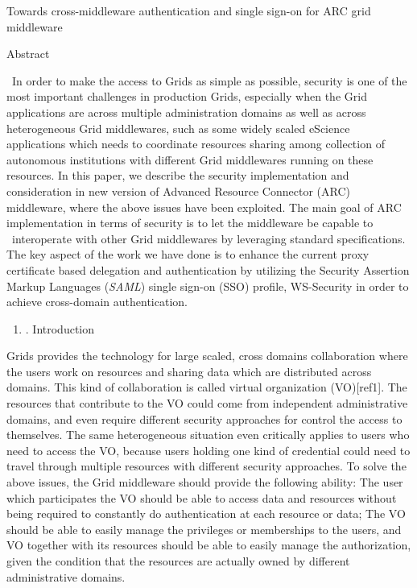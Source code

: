 \documentclass{article}
\title{}
\newcommand\liststyleLi{%
\renewcommand\theenumi{\arabic{enumi}}
\renewcommand\theenumii{\arabic{enumii}}
\renewcommand\theenumiii{\arabic{enumiii}}
\renewcommand\theenumiv{\arabic{enumiv}}
\renewcommand\labelenumi{\theenumi.}
\renewcommand\labelenumii{\theenumii.}
\renewcommand\labelenumiii{\theenumiii.}
\renewcommand\labelenumiv{\theenumiv.}
}
\begin{document}
{\centering
Towards cross-middleware authentication and single sign-on for ARC grid
middleware
\par}


\bigskip

{\centering
Abstract
\par}

\ In order to make the access to Grids as simple as possible, security
is one of the most important challenges in production Grids, especially
when the Grid applications are across multiple administration domains
as well as across heterogeneous Grid middlewares, such as some widely
scaled eScience applications which needs to coordinate resources
sharing among collection of autonomous institutions with different Grid
middlewares running on these resources. In this paper, we describe the
security implementation and consideration in new version of Advanced
Resource Connector (ARC) middleware, where the above issues have been
exploited. The main goal of ARC implementation in terms of security is
to let the middleware be capable to \ interoperate with other Grid
middlewares by leveraging standard specifications. The key aspect of
the work we have done is to enhance the current proxy certificate based
delegation and authentication by utilizing the Security Assertion
Markup Languages (\textit{SAML}) single sign-on (SSO) profile,
WS-Security in order to achieve cross-domain authentication. \ 


\bigskip

\liststyleLi
\begin{enumerate}
\item[] {. Introduction
\par}
\end{enumerate}
Grids provides the technology for large scaled, cross domains
collaboration where the users work on resources and sharing data which
are distributed across domains. This kind of collaboration is called
virtual organization (VO)[ref1]. The resources that contribute to the
VO could come from independent administrative domains, and even require
different security approaches for control the access to themselves. The
same heterogeneous situation even critically applies to users who need
to access the VO, because users holding one kind of credential could
need to travel through multiple resources with different security
approaches. To solve the above issues, the Grid middleware should
provide the following ability: The user which participates the VO
should be able to access data and resources without being required to
constantly do authentication at each resource or data; The VO should be
able to easily manage the privileges or memberships to the users, and
VO together with its resources should be able to easily manage the
authorization, given the condition that the resources are actually
owned by different administrative domains.
\end{document}

